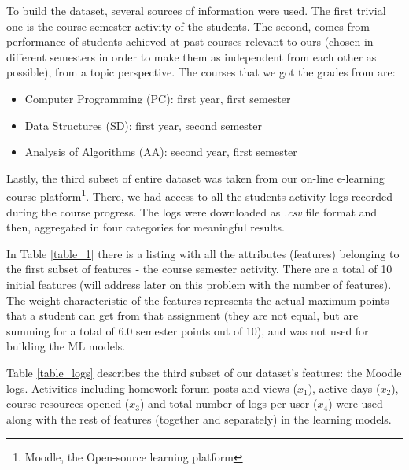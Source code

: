 To build the dataset, several sources of information were used. The first 
trivial one is the course semester activity of the students. The second, 
comes from performance of students achieved at past courses relevant to ours 
(chosen in different semesters in order to make them as independent from each 
other as possible), from a topic perspective. The courses that we got the 
grades from are:
\begin{itemize}
\item Computer Programming (PC): first year, first semester
\item Data Structures (SD): first year, second semester
\item Analysis of Algorithms (AA): second year, first semester
\end{itemize}
Lastly, the third subset of entire dataset was taken from our on-line 
e-learning course platform\footnote{Moodle, the Open-source learning platform}. 
There, we had access to all the students activity logs recorded during the 
course progress. The logs were downloaded as {\it .csv} file format and then, 
aggregated in four categories for meaningful results.

In Table \ref{table_1} there is a listing with all the attributes (features) 
belonging to the first subset of features - the course semester activity.
There are a total of 10 initial features (will address later on this problem 
with the number of features). The weight characteristic of the features 
represents the actual maximum points that a student can get from that 
assignment (they are not equal, but are summing for a total of 6.0 semester 
points out of 10), and was not used for building the ML models.

Table \ref{table_logs} describes the third subset of our dataset's features: 
the Moodle logs. Activities including homework forum posts and views ($x_{1}$), active days 
($x_{2}$), course resources opened ($x_{3}$) and total number of logs per 
user ($x_{4}$) were used along with the rest of features (together and 
separately) in the learning models.

